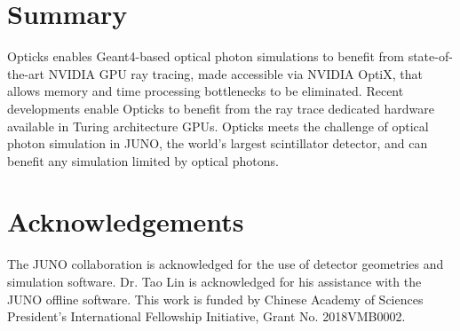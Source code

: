 \documentclass{webofc}
\begin{document}
\section{Summary}
%
Opticks enables Geant4-based optical photon simulations to benefit from 
state-of-the-art NVIDIA GPU ray tracing, made accessible via NVIDIA OptiX,
that allows memory and time processing bottlenecks to be eliminated.
Recent developments enable Opticks to benefit from the ray trace dedicated 
hardware available in Turing architecture GPUs.
Opticks meets the challenge of optical photon simulation in JUNO, 
the world's largest scintillator detector, and can benefit any simulation limited by optical photons. 
%
%
%
\section*{Acknowledgements}
%
The JUNO collaboration is acknowledged for the use of detector 
geometries and simulation software. Dr. Tao Lin is acknowledged for his assistance with 
the JUNO offline software. 
This work is funded by Chinese Academy of Sciences President’s International Fellowship Initiative,
Grant No. 2018VMB0002.
%
%
%
\newpage
\end{document}
